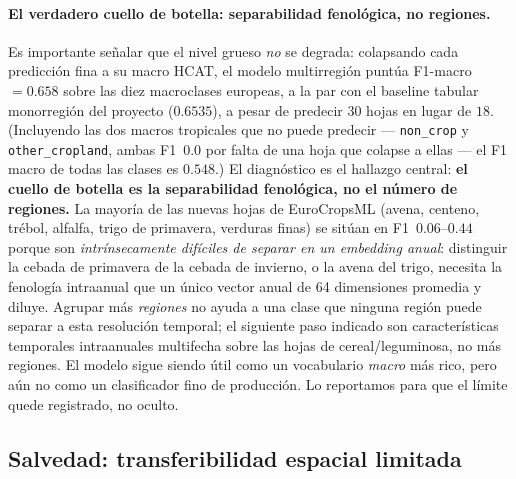 \paragraph{El verdadero cuello de botella: separabilidad fenológica, no regiones.}
Es importante señalar que el nivel grueso \emph{no} se degrada:
colapsando cada predicción fina a su macro HCAT, el modelo multirregión
puntúa F1-macro~$=0.658$ sobre las diez macroclases europeas, a la par
con el baseline tabular monorregión del proyecto ($0.6535$), a pesar de
predecir $30$ hojas en lugar de $18$. (Incluyendo las dos macros
tropicales que no puede predecir --- \texttt{non\_crop} y
\texttt{other\_cropland}, ambas F1~$0.0$ por falta de una hoja que
colapse a ellas --- el F1 macro de todas las clases es $0.548$.) El
diagnóstico es el hallazgo central: \textbf{el cuello de botella es la
separabilidad fenológica, no el número de regiones.} La mayoría de las
nuevas hojas de EuroCropsML (avena, centeno, trébol, alfalfa, trigo de
primavera, verduras finas) se sitúan en F1~$0.06$--$0.44$ porque son
\emph{intrínsecamente difíciles de separar en un embedding anual}:
distinguir la cebada de primavera de la cebada de invierno, o la avena
del trigo, necesita la fenología intraanual que un único vector anual de
64 dimensiones promedia y diluye. Agrupar más \emph{regiones} no ayuda a
una clase que ninguna región puede separar a esta resolución temporal; el
siguiente paso indicado son características temporales intraanuales
multifecha sobre las hojas de cereal/leguminosa, no más regiones. El
modelo sigue siendo útil como un vocabulario \emph{macro} más rico, pero
aún no como un clasificador fino de producción. Lo reportamos para que el
límite quede registrado, no oculto.

\subsection{Salvedad: transferibilidad espacial limitada}
\label{sec:multiregion:caveat}

